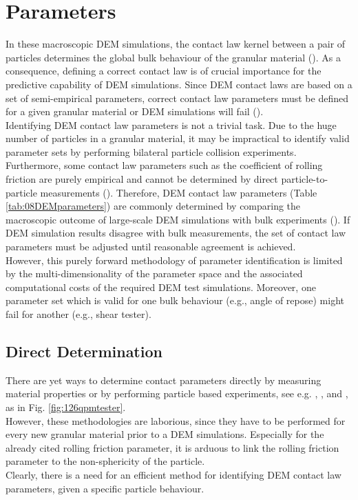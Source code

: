 \section{Parameters}
\label{sec:parameters}

In these macroscopic \acs{DEM} simulations, the contact law kernel between a 
pair of particles determines the global bulk behaviour of the granular material
(\citet{RefWorks:131}).
As a consequence, defining a correct contact law is of crucial importance for the predictive 
capability of \acs{DEM} simulations. 
Since \acs{DEM} contact laws are based 
on a set of semi-empirical parameters, correct contact law 
parameters must be defined for a given granular material
or \acs{DEM} simulations will fail (\citet{RefWorks:177}). \\
Identifying \acs{DEM} contact law parameters is not a trivial task. 
Due to the huge number of particles in a granular material, it
may be impractical to identify valid parameter sets by performing bilateral 
particle collision experiments. 
Furthermore, some contact law parameters such as the coefficient of rolling
friction are purely empirical and cannot be determined by direct 
particle-to-particle measurements (\citet{RefWorks:87}).
Therefore, \acs{DEM} contact law parameters (Table \ref{tab:08DEMparameters}) are
commonly determined by comparing the macroscopic outcome of large-scale \acs{DEM}
simulations with bulk experiments (\citet{RefWorks:91}). 
If \acs{DEM} simulation results disagree with bulk measurements, the set of contact
law parameters must be adjusted until reasonable agreement is achieved.\\
However, this purely forward methodology of parameter identification is limited by 
the multi-dimensionality of the parameter space and the associated computational costs of the required 
\acs{DEM} test simulations. 
Moreover, one parameter set which is valid for one bulk behaviour (e.g., angle
of repose) might fail for another (e.g., shear tester). \\

\subsection{Direct Determination}
\label{subsec:directdetermination}


There are yet ways to determine contact parameters directly by measuring
material properties or by performing particle based experiments, see e.g.
\citet{RefWorks:177}, \citet{RefWorks:181}, and \citet{RefWorks:186}, as in
Fig. \ref{fig:126qpmtester}.\\
However, these methodologies are laborious, 
since they have to be performed for every new granular material prior to a \acs{DEM}
simulations. 
Especially for the already cited rolling friction parameter, it is arduous to
link the rolling friction parameter to the non-sphericity of the particle. \\
Clearly, there is a
need for an efficient method for identifying \acs{DEM} contact law parameters, given
a specific particle behaviour.



